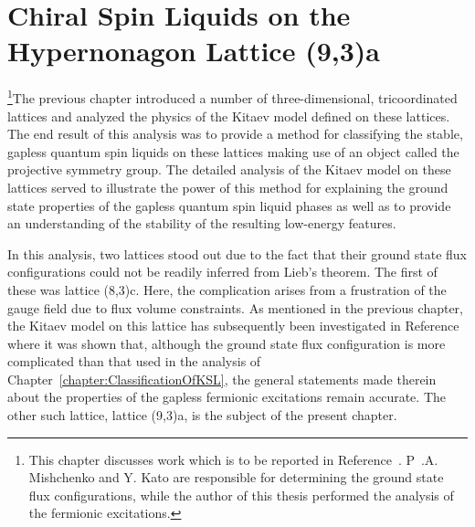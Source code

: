 \chapter{Chiral Spin Liquids on the Hypernonagon Lattice (9,3)a}
\label{chapter:HypernonagonLattice}
%
%
\footnote{This chapter discusses work which is to be reported in Reference~\cite{MischenkoPRB2019}. P~.A. Mishchenko and Y. Kato are responsible for determining the ground state flux configurations, while the author of this thesis performed the analysis of the fermionic excitations.}The previous chapter introduced a number of three-dimensional, tricoordinated lattices and analyzed the physics of the Kitaev model defined on these lattices.
The end result of this analysis was to provide a method for classifying the stable, gapless quantum spin liquids on these lattices making use of an object called the projective symmetry group.
The detailed analysis of the Kitaev model on these lattices served to illustrate the power of this method for explaining the ground state properties of the gapless quantum spin liquid phases as well as to provide an understanding of the stability of the resulting low-energy features.

In this analysis, two lattices stood out due to the fact that their ground state flux configurations could not be readily inferred from Lieb's theorem.
The first of these was lattice (8,3)c.
Here, the complication arises from a frustration of the gauge field due to flux volume constraints.
As mentioned in the previous chapter, the Kitaev model on this lattice has subsequently been investigated in Reference~\cite{EschmannPRL2019} where it was shown that, although the ground state flux configuration is more complicated than that used in the analysis of Chapter~\ref{chapter:ClassificationOfKSL}, the general statements made therein about the properties of the gapless fermionic excitations remain accurate.
The other such lattice, lattice (9,3)a, is the subject of the present chapter.

